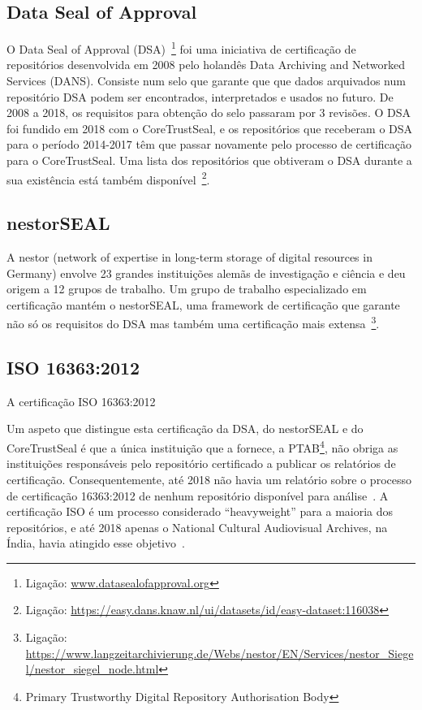 \documentclass[sigconf,nonacm]{acmart}
\begin{document}
\subsection{Data Seal of Approval} %
\label{sub:data_seal_of_approval}

O Data Seal of Approval (DSA)~\footnote{Ligação: \url{www.datasealofapproval.org}} foi uma iniciativa de certificação de repositórios desenvolvida em 2008 pelo holandês Data Archiving and Networked Services (DANS). Consiste num selo que garante que que dados arquivados num repositório DSA podem ser encontrados, interpretados e usados no futuro. De 2008 a 2018, os requisitos para obtenção do selo passaram por 3 revisões. O DSA foi fundido em 2018 com o CoreTrustSeal, e os repositórios que receberam o DSA para o período 2014-2017 têm que passar novamente pelo processo de certificação para o CoreTrustSeal. Uma lista dos repositórios que obtiveram o DSA durante a sua existência está também disponível~\footnote{Ligação: \url{https://easy.dans.knaw.nl/ui/datasets/id/easy-dataset:116038}}.


\subsection{nestorSEAL} %
\label{sub:nestorseal}

A nestor (network of expertise in long-term storage of digital resources in Germany) envolve 23 grandes instituições alemãs de investigação e ciência e deu origem a 12 grupos de trabalho. Um grupo de trabalho especializado em certificação mantém o nestorSEAL, uma framework de certificação que garante não só os requisitos do DSA mas também uma certificação mais extensa~\footnote{Ligação: \url{https://www.langzeitarchivierung.de/Webs/nestor/EN/Services/nestor_Siegel/nestor_siegel_node.html}}. 


\subsection{ISO 16363:2012} %
\label{sub:iso_16363_2012}


A certificação ISO 16363:2012 

Um aspeto que distingue esta certificação da DSA, do nestorSEAL e do CoreTrustSeal é que a única instituição que a fornece, a PTAB\footnote{Primary Trustworthy Digital Repository Authorisation Body}, não obriga as instituições responsáveis pelo repositório certificado a publicar os relatórios de certificação. Consequentemente, até 2018 não havia um relatório sobre o processo de certificação 16363:2012 de nenhum repositório disponível para análise~\cite{Lindlar_Schwab_2019}. A certificação ISO é um processo considerado ``heavyweight'' para a maioria dos repositórios, e até 2018 apenas o National Cultural Audiovisual Archives, na Índia, havia atingido esse objetivo~\cite{Lindlar_Schwab_2019,IndianMinistryofCulture2017}.
\end{document}
